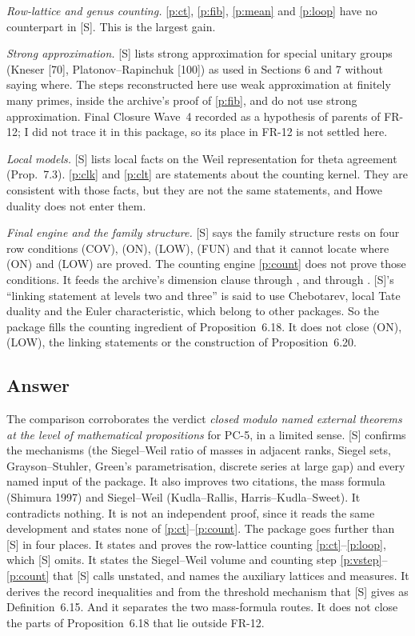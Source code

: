 \documentclass[11pt]{article}
\newcommand{\FR}[1]{\textsf{FR-#1}}
\newcommand{\PC}[1]{\textsf{PC-#1}}
\theoremstyle{remark}
\begin{document}
\emph{Row-lattice and genus counting.} \ref{p:ct}, \ref{p:fib}, \ref{p:mean} and \ref{p:loop} have no counterpart in [S]. This is the largest gain.

\emph{Strong approximation.} [S] lists strong approximation for special unitary groups (Kneser [70], Platonov--Rapinchuk [100]) as used in Sections 6 and 7 without saying where. The steps reconstructed here use weak approximation at finitely many primes, inside the archive's proof of \ref{p:fib}, and do not use strong approximation. Final Closure Wave~4 recorded  as a hypothesis of parents of \FR{12}; I did not trace it in this package, so its place in \FR{12} is not settled here.

\emph{Local models.} [S] lists local facts on the Weil representation for theta agreement (Prop.~7.3). \ref{p:clk} and \ref{p:clt} are statements about the counting kernel. They are consistent with those facts, but they are not the same statements, and Howe duality does not enter them.

\emph{Final engine and the family structure.} [S] says the family structure rests on four row conditions (COV), (ON), (LOW), (FUN) and that it cannot locate where (ON) and (LOW) are proved. The counting engine \ref{p:count} does not prove those conditions. It feeds the archive's  dimension clause through , and  through . [S]'s ``linking statement at levels two and three'' is said to use Chebotarev, local Tate duality and the Euler characteristic, which belong to other packages. So the package fills the counting ingredient of Proposition~6.18. It does not close (ON), (LOW), the linking statements or the construction of Proposition~6.20.

\subsection*{Answer}

The comparison corroborates the verdict \emph{closed modulo named external theorems at the level of mathematical propositions} for \PC{5}, in a limited sense. [S] confirms the mechanisms (the Siegel--Weil ratio of masses in adjacent ranks, Siegel sets, Grayson--Stuhler, Green's parametrisation, discrete series at large gap) and every named input of the package. It also improves two citations, the mass formula (Shimura 1997) and Siegel--Weil (Kudla--Rallis, Harris--Kudla--Sweet). It contradicts nothing. It is not an independent proof, since it reads the same development and states none of \ref{p:ct}--\ref{p:count}. The package goes further than [S] in four places. It states and proves the row-lattice counting \ref{p:ct}--\ref{p:loop}, which [S] omits. It states the Siegel--Weil volume and counting step \ref{p:vstep}--\ref{p:count} that [S] calls unstated, and names the auxiliary lattices and measures. It derives the record inequalities and  from the threshold mechanism that [S] gives as Definition~6.15. And it separates the two mass-formula routes. It does not close the parts of Proposition~6.18 that lie outside \FR{12}.
\end{document}
